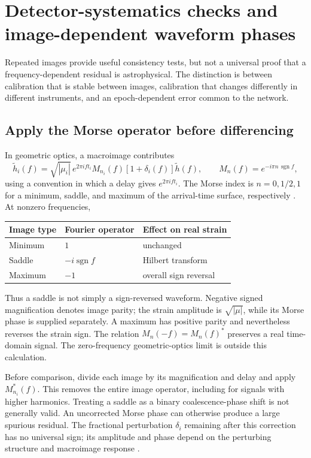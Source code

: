 \section{Detector-systematics checks and image-dependent waveform phases}
\label{sec:systematics}

Repeated images provide useful consistency tests, but not a universal proof
that a frequency-dependent residual is astrophysical. The distinction is between
calibration that is stable between images, calibration that changes differently
in different instruments, and an epoch-dependent error common to the network.

\subsection{Apply the Morse operator before differencing}

In geometric optics, a macroimage contributes
\begin{equation}
 \widetilde h_i(f)=\sqrt{|\mu_i|}\,e^{2\pi ift_i}
 M_{n_i}(f)[1+\delta_i(f)]\widetilde h(f),\qquad
 M_n(f)=e^{-i\pi n\,\operatorname{sgn}f},
 \label{eq:sys_morse}
\end{equation}
using a convention in which a delay gives \(e^{2\pi ift_i}\).
The Morse index is \(n=0,1/2,1\) for a minimum, saddle, and maximum of
the arrival-time surface, respectively \cite{dai2017}. At nonzero frequencies,
\begin{center}
\begin{tabular}{lll}
Image type & Fourier operator & Effect on real strain \\
\hline
Minimum & \(1\) & unchanged \\
Saddle & \(-i\operatorname{sgn}f\) & Hilbert transform \\
Maximum & \(-1\) & overall sign reversal
\end{tabular}
\end{center}
Thus a saddle is not simply a sign-reversed waveform. Negative signed
magnification denotes image parity; the strain amplitude is
\(\sqrt{|\mu|}\), while its Morse phase is supplied separately. A maximum
has positive parity and nevertheless reverses the strain sign.
The relation \(M_n(-f)=M_n(f)^*\) preserves a real time-domain signal.
The zero-frequency geometric-optics limit is outside this calculation.

Before comparison, divide each image by its magnification and delay and apply
\(M_{n_i}^*(f)\). This removes the entire image operator, including for signals
with higher harmonics. Treating a saddle as a binary coalescence-phase shift is
not generally valid. An uncorrected Morse phase can otherwise produce a large
spurious residual. The fractional perturbation \(\delta_i\) remaining after
this correction has no universal sign; its amplitude and phase depend on the
perturbing structure and macroimage response \cite{oguri2022}.

